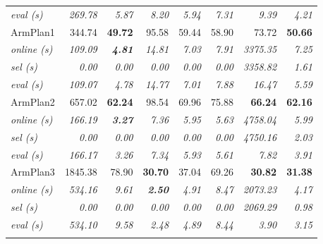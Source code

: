 \documentclass[nobib]{tufte-book}
\begin{document}
\begin{figure}[t!]
{{\begin{tabular}{lrrrrrrr}
         \;\;\;\;\emph{eval (s)} & \emph{269.78} & \emph{5.87} & \emph{8.20} & \emph{5.94} & \emph{7.31} & \emph{9.39} & \emph{4.21} \\
         \addlinespace[0.3em]
         ArmPlan1 &  344.74 & \textbf{49.72} & 95.58 & 59.44 & 58.90 & 73.72 & \textbf{50.66} \\
         \;\;\emph{online (s)} & \emph{109.09} & \bf\emph{4.81} & \emph{14.81} & \emph{7.03} & \emph{7.91} & \emph{3375.35} & \emph{7.25} \\
         \;\;\;\;\emph{sel (s)} & \emph{0.00} & \emph{0.00} & \emph{0.00} & \emph{0.00} & \emph{0.00} & \emph{3358.82} & \emph{1.61} \\
         \;\;\;\;\emph{eval (s)} & \emph{109.07} & \emph{4.78} & \emph{14.77} & \emph{7.01} & \emph{7.88} & \emph{16.47} & \emph{5.59} \\
         \addlinespace[0.3em]
         ArmPlan2 &  657.02 & \textbf{62.24} & 98.54 & 69.96 & 75.88 & \textbf{66.24} & \textbf{62.16} \\
         \;\;\emph{online (s)} & \emph{166.19} & \bf\emph{3.27} & \emph{7.36} & \emph{5.95} & \emph{5.63} & \emph{4758.04} & \emph{5.99} \\
         \;\;\;\;\emph{sel (s)} & \emph{0.00} & \emph{0.00} & \emph{0.00} & \emph{0.00} & \emph{0.00} & \emph{4750.16} & \emph{2.03} \\
         \;\;\;\;\emph{eval (s)} & \emph{166.17} & \emph{3.26} & \emph{7.34} & \emph{5.93} & \emph{5.61} & \emph{7.82} & \emph{3.91} \\
         \addlinespace[0.3em]
         ArmPlan3 & 1845.38 & 78.90 & \textbf{30.70} & 37.04 & 69.26 & \textbf{30.82} & \textbf{31.38} \\
         \;\;\emph{online (s)} & \emph{534.16} & \emph{9.61} & \bf\emph{2.50} & \emph{4.91} & \emph{8.47} & \emph{2073.23} & \emph{4.17} \\
         \;\;\;\;\emph{sel (s)} & \emph{0.00} & \emph{0.00} & \emph{0.00} & \emph{0.00} & \emph{0.00} & \emph{2069.29} & \emph{0.98} \\
         \;\;\;\;\emph{eval (s)} & \emph{534.10} & \emph{9.58} & \emph{2.48} & \emph{4.89} & \emph{8.44} & \emph{3.90} & \emph{3.15} \\
         \addlinespace[0.15em]
         \bottomrule
      \end{tabular}%
      }%
      \label{subfig:table-results}
   }
   
   \vspace{0.1in}
   

\end{figure}
\end{document}

